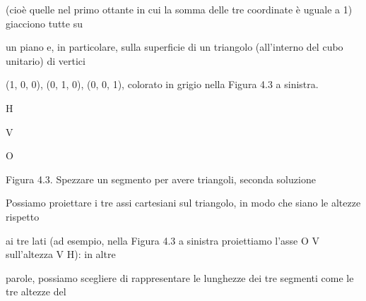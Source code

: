 \documentclass[a4paper,portrait,12pt]{article}
\begin{document}
\begin{flushleft}
(cio\`{e} quelle nel primo ottante in cui la somma delle tre coordinate \`{e} uguale a 1) giacciono tutte su
\end{flushleft}


\begin{flushleft}
un piano e, in particolare, sulla superficie di un triangolo (all'interno del cubo unitario) di vertici
\end{flushleft}


\begin{flushleft}
(1, 0, 0), (0, 1, 0), (0, 0, 1), colorato in grigio nella Figura 4.3 a sinistra.
\end{flushleft}





\begin{flushleft}
H
\end{flushleft}





\begin{flushleft}
V
\end{flushleft}





\begin{flushleft}
O
\end{flushleft}





\begin{flushleft}
Figura 4.3. Spezzare un segmento per avere triangoli, seconda soluzione
\end{flushleft}





\begin{flushleft}
Possiamo proiettare i tre assi cartesiani sul triangolo, in modo che siano le altezze rispetto
\end{flushleft}


\begin{flushleft}
ai tre lati (ad esempio, nella Figura 4.3 a sinistra proiettiamo l'asse O V sull'altezza V H): in altre
\end{flushleft}


\begin{flushleft}
parole, possiamo scegliere di rappresentare le lunghezze dei tre segmenti come le tre altezze del
\end{flushleft}
\end{document}

